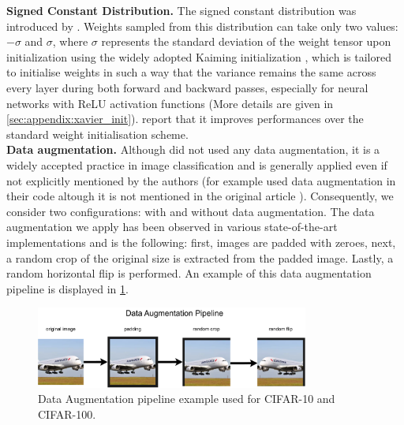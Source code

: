 \noindent\textbf{Signed Constant Distribution.} The signed constant
distribution was introduced by \cite{DBLP:conf/nips/ZhouLLY19}. Weights sampled
from this distribution can take only two values: $-\sigma$ and $\sigma$, where
$\sigma$ represents the standard deviation of the weight tensor upon
initialization using the widely adopted Kaiming initialization
\cite{DBLP:conf/iccv/HeZRS15}, which is tailored to initialise weights in such a
way that the variance remains the same across every layer during both forward
and backward passes, especially for neural networks with \ac{ReLU} activation
functions (More details are given in \cref{sec:appendix:xavier_init}).
\citeauthor{DBLP:conf/nips/ZhouLLY19} report that it improves performances over
the standard weight initialisation scheme.\\

\noindent\textbf{Data augmentation.} Although
\citeauthor{DBLP:conf/nips/ZhouLLY19} \cite{DBLP:conf/nips/ZhouLLY19} did not
used any data augmentation, it is a widely accepted practice in image
classification and is generally applied even if not explicitly mentioned by the
authors (for example \citeauthor{DBLP:conf/cvpr/RamanujanWKFR20} used data
augmentation in their code \cite{hidden-networks} altough it is not mentioned in
the original article \cite{DBLP:conf/cvpr/RamanujanWKFR20}). Consequently, we
consider two configurations: with and without data augmentation. The data
augmentation we apply has been observed in various state-of-the-art
implementations
\cite{hidden-networks,openlth_dataaugmentation,rethinking_dataaugmentatino} and
is the following: first, images are padded with zeroes, next, a random crop of
the original size is extracted from the padded image. Lastly, a random
horizontal flip is performed. An example of this data augmentation pipeline is
displayed in \cref{fig:chap2:data_augmentation_pipeline}.\\

\begin{figure}[!ht]
  \centering
  \includegraphics[width=0.8\textwidth]{chapter_2/assets/data_augmentation_pipeline.pdf}
  \caption{Data Augmentation pipeline example used for CIFAR-10 and CIFAR-100.}
  \label{fig:chap2:data_augmentation_pipeline}
\end{figure}

